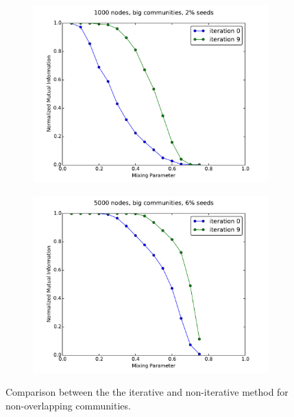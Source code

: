 \begin{figure}
    \centering
    \begin{subfigure}{0.5\textwidth}
    \includegraphics[width=\linewidth]{allplots/nonoverlap_compare_a.pdf}
    \end{subfigure}%
    \begin{subfigure}{0.5\textwidth}
    \includegraphics[width=\linewidth]{allplots/nonoverlap_compare_b.pdf}
    \end{subfigure}
    \caption{Comparison between the the iterative and non-iterative method for non-overlapping communities.}
\end{figure}



